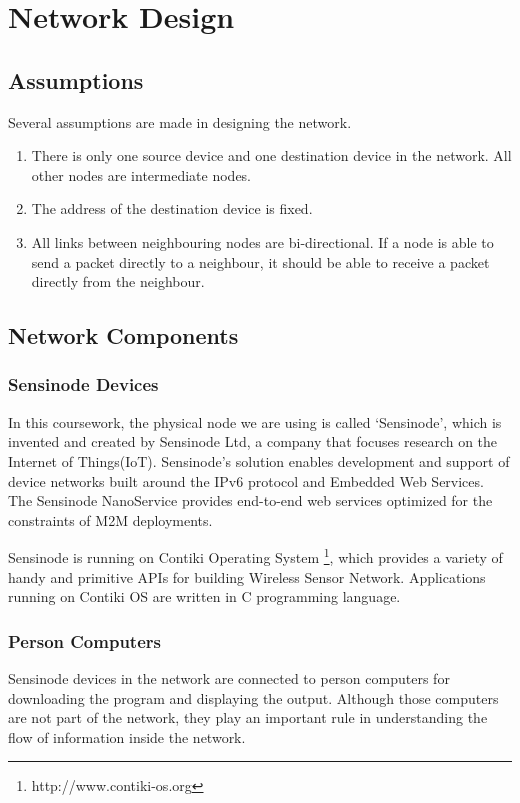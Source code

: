 \chapter{Network Design}
\label{chap:design}

\section{Assumptions}

Several assumptions are made in designing the network.
\begin{enumerate}
    \item There is only one source device and one destination device in the network. All other nodes are intermediate nodes.
    \item The address of the destination device is fixed.
    \item All links between neighbouring nodes are bi-directional. If a node is able to send a packet directly to a neighbour, it should be able to receive a packet directly from the neighbour.
\end{enumerate}

\section{Network Components}

\subsection{Sensinode Devices}

In this coursework, the physical node we are using is called ‘Sensinode’, which is invented and created by Sensinode Ltd, a company that focuses research on the Internet of Things(IoT). 
Sensinode’s solution enables development and support of device networks built around the IPv6 protocol and Embedded Web Services. 
The Sensinode NanoService provides end-to-end web services optimized for the constraints of M2M deployments. 

Sensinode is running on Contiki Operating System \footnote{http://www.contiki-os.org}, which provides a variety of handy and primitive APIs for building Wireless Sensor Network.
Applications running on Contiki OS are written in C programming language.

\subsection{Person Computers}
Sensinode devices in the network are connected to person computers for downloading the program and displaying the output. Although those computers are not part of the network, they play an important rule in understanding the flow of information inside the network.


